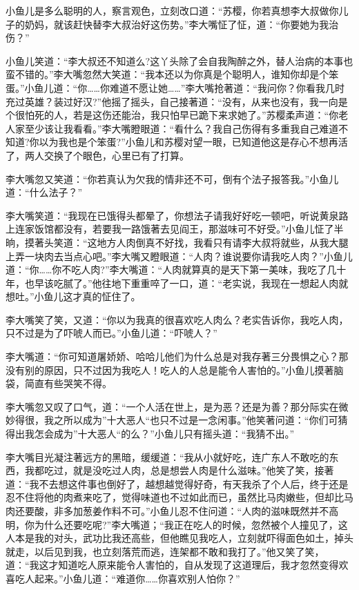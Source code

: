\documentclass[12pt,oneside]{book}
\begin{document}
小鱼儿是多么聪明的人，察言观色，立刻改口道：``苏樱，你若真想李大叔做你儿子的奶妈，就该赶快替李大叔治好这伤势。''李大嘴怔了怔，道：``你要她为我治伤？''

小鱼儿笑道：``李大叔还不知道么?这丫头除了会自我陶醉之外，替人治病的本事也蛮不错的。''李大嘴忽然大笑道：``我本还以为你真是个聪明人，谁知你却是个笨蛋。''小鱼儿道：``你\ldots\ldots 你难道不愿让她\ldots\ldots{}''李大嘴抢著道：``我问你？你看我几时充过英雄？装过好汉?''他摇了摇头，自己接著道：``没有，从来也没有，我一向是个很怕死的人，若是这伤还能治，我只怕早已跪下来求她了。''苏樱柔声道：``你老人家至少该让我看看。''李大嘴瞪眼道：``看什么？我自己伤得有多重我自己难道不知道?你以为我也是个笨蛋?''小鱼儿和苏樱对望一眼，已知道他这是存心不想再活了，两人交换了个眼色，心里已有了打算。

李大嘴忽又笑道：``你若真认为欠我的情非还不可，倒有个法子报答我。''小鱼儿道：``什么法子？''

李大嘴笑道：``我现在已饿得头都晕了，你想法子请我好好吃一顿吧，听说黄泉路上连家饭馆都没有，若要我一路饿著去见阎王，那滋味可不好受。''小鱼儿怔了半晌，摸著头笑道：``这地方人肉倒真不好找，我看只有请李大叔将就些，从我大腿上弄一块肉去当点心吧。''李大嘴又瞪眼道：``人肉？谁说要你请我吃人肉？''小鱼儿道：``你\ldots\ldots 你不吃人肉?''李大嘴道：``人肉就算真的是天下第一美味，我吃了几十年，也早该吃腻了。''他往地下重重啐了一口，道：``老实说，我现在一想起人肉就想吐。''小鱼儿这才真的怔住了。

李大嘴笑了笑，又道：``你以为我真的很喜欢吃人肉么？老实告诉你，我吃人肉，只不过是为了吓唬人而已。''小鱼儿道：``吓唬人？''

李大嘴道：``你可知道屠娇娇、哈哈儿他们为什么总是对我存著三分畏惧之心？那没有别的原因，只不过因为我吃人！吃人的人总是能令人害怕的。''小鱼儿摸著脑袋，简直有些哭笑不得。

李大嘴忽又叹了口气，道：``一个人活在世上，是为恶？还是为善？那分际实在微妙得很，我之所以成为''十大恶人``也只不过是一念闲事。''他笑著问道：``你们可猜得出我怎会成为''十大恶人``的么？''小鱼儿只有摇头道：``我猜不出。''

李大嘴目光凝注著远方的黑暗，缓缓道：``我从小就好吃，连广东人不敢吃的东西，我都吃过，就是没吃过人肉，总是想尝人肉是什么滋味。''他笑了笑，接著道：``我不去想这件事也倒好了，越想越觉得好奇，有天我杀了个人后，终于还是忍不住将他的肉煮来吃了，觉得味道也不过如此而已，虽然比马肉嫩些，但却比马肉还要酸，非多加葱姜作料不可。''小鱼儿忍不住问道：``人肉的滋味既然并不高明，你为什么还要吃呢?''李大嘴道；``我正在吃人的时候，忽然被个人撞见了，这人本是我的对头，武功比我还高些，但他瞧见我吃人，立刻就吓得面色如土，掉头就走，以后见到我，也立刻落荒而逃，连架都不敢和我打了。''他又笑了笑，道：``我这才知道吃人原来能令人害怕的，自从发现了这道理后，我才忽然变得欢喜吃人起来。''小鱼儿道：``难道你\ldots\ldots 你喜欢别人怕你？''
\end{document}
